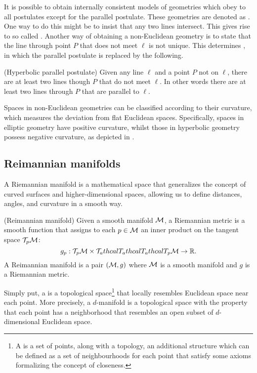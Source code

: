 It is possible to obtain internally consistent models of geometries which obey to all postulates except for the parallel postulate. These geometries are denoted as . One way to do this might be to insist that any two lines intersect. This gives rise to so called . Another way of obtaining a non-Euclidean geometry is to state that the line through point $P$ that does not meet $\ell$ is not unique. This determines , in which the parallel postulate is replaced by the following.


\begin{postulate}(Hyperbolic parallel postulate)
    Given any line $\ell$ and a point $P$ not on $\ell$, there are at least two lines though $P$ that do not meet $\ell$. In other words there are at least two lines through $P$ that are parallel to $\ell$.
\end{postulate}



Spaces in non-Euclidean geometries can be classified according to their curvature, which measures the deviation from flat Euclidean spaces. Specifically, spaces in elliptic geometry have positive curvature, whilst those in hyperbolic geometry possess negative curvature, as depicted in . 

\subsection{Reimannian manifolds}
A Riemannian manifold is a mathematical space that generalizes the concept of curved surfaces and higher-dimensional spaces, allowing us to define distances, angles, and curvature in a smooth way. 

\begin{definition} (Reimannian manifold)
Given a smooth manifold $\mathcal{M}$, a Riemannian metric is a smooth function that assigns to each $p \in \mathcal{M}$ an inner product on the tangent space $\mathcal{T}_p\mathcal{M}$:
\begin{equation*}
    g_p: \mathcal{T}_p\mathcal{M} \times \mathcal{T}_athcal{T}_athcal{T}_athcal{T}_p\mathcal{M} \to \mathbb{R}.
\end{equation*}
    A Reimannian manifold is a pair $(\mathcal{M},g)$ where $\mathcal{M}$ is a smooth manifold and $g$ is a Riemannian metric.
\end{definition}

Simply put, a  is a topological space\footnote{A  is a set of points, along with a topology, an additional structure which can be defined as a set of neighbourhoods for each point that satisfy some axioms formalizing the concept of closeness.} that locally resembles Euclidean space near each point. More precisely, a $d$-manifold  is a topological space with the property that each point has a neighborhood that resembles an open subset of $d$-dimensional Euclidean space. 

